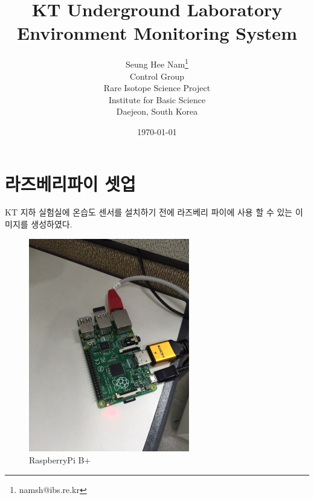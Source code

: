 \documentclass[11pt
  , a4paper
  , article
  , oneside
]{memoir}
\begin{document}
\newcommand{\technumber}{
  RAON Control-Document Series\\
  Revision : v0.1,   Release : 2015.11.2}
\title{\textbf{KT Underground Laboratory Environment Monitoring System\\}}


\author{Seung Hee Nam\thanks{namsh@ibs.re.kr} \\
  Control Group \\
  Rare Isotope Science Project\\
  Institute for Basic Science\\
  Daejeon, South Korea
}

\date{\today}

\renewcommand{\maketitlehooka}{\begin{flushright}\textsf{\technumber}\end{flushright}}

\maketitle




\chapter{라즈베리파이 셋업}


KT 지하 실험실에 온습도 센서를 설치하기 전에 라즈베리 파이에 사용 할 수 있는 이미지를 생성하였다.
\begin{figure}[h]
	\begin{center}
		\includegraphics[width=7cm]{./images/1.JPG}
		\caption{RaspberryPi B+}
	\end{center}
\end{figure}
\end{document}
